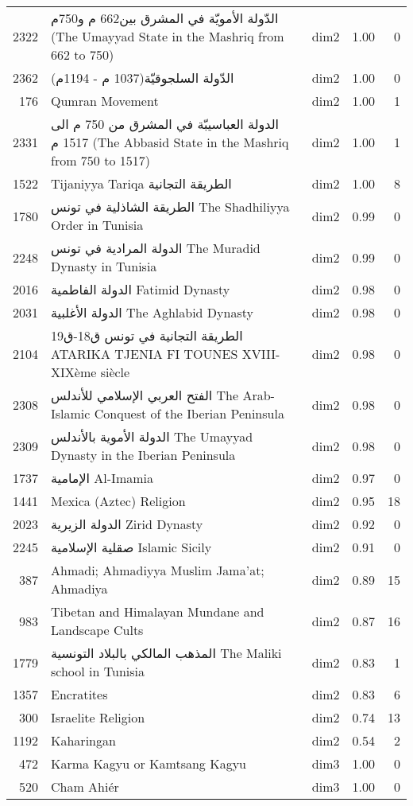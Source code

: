 \begin{tabular}{rllrr}
2322 & الدّولة الأمويّة في المشرق  بين662 م و750م (The Umayyad State in the Mashriq from 662 to 750) & dim2 & 1.00 & 0 \\
2362 & الدّولة السلجوقيّة(1037 م - 1194م) & dim2 & 1.00 & 0 \\
176 & Qumran Movement & dim2 & 1.00 & 1 \\
2331 & الدولة العباسيبّة في المشرق  من 750 م الى 1517 م (The Abbasid State in the Mashriq from 750 to 1517) & dim2 & 1.00 & 1 \\
1522 & Tijaniyya Tariqa الطريقة التجانية & dim2 & 1.00 & 8 \\
1780 & الطريقة الشاذلية في تونس The Shadhiliyya Order in Tunisia & dim2 & 0.99 & 0 \\
2248 & الدولة المرادية في تونس The Muradid Dynasty in Tunisia & dim2 & 0.99 & 0 \\
2016 & الدولة الفاطمية Fatimid Dynasty & dim2 & 0.98 & 0 \\
2031 & الدولة الأغلبية The Aghlabid Dynasty & dim2 & 0.98 & 0 \\
2104 & الطريقة التجانية في تونس ق18-ق19 ATARIKA TJENIA FI TOUNES  XVIII-XIXème siècle & dim2 & 0.98 & 0 \\
2308 & الفتح العربي الإسلامي للأندلس The Arab-Islamic Conquest of the Iberian Peninsula & dim2 & 0.98 & 0 \\
2309 & الدولة الأموية بالأندلس The Umayyad Dynasty in the Iberian Peninsula & dim2 & 0.98 & 0 \\
1737 & الإمامية Al-Imamia & dim2 & 0.97 & 0 \\
1441 & Mexica (Aztec) Religion & dim2 & 0.95 & 18 \\
2023 & الدولة الزيرية Zirid Dynasty & dim2 & 0.92 & 0 \\
2245 & صقلية الإسلامية Islamic Sicily & dim2 & 0.91 & 0 \\
387 & Ahmadi; Ahmadiyya Muslim Jama'at; Ahmadiya & dim2 & 0.89 & 15 \\
983 & Tibetan and Himalayan Mundane and Landscape Cults & dim2 & 0.87 & 16 \\
1779 & المذهب المالكي بالبلاد التونسية The Maliki school in Tunisia & dim2 & 0.83 & 1 \\
1357 & Encratites & dim2 & 0.83 & 6 \\
300 & Israelite Religion & dim2 & 0.74 & 13 \\
1192 & Kaharingan & dim2 & 0.54 & 2 \\
472 & Karma Kagyu or Kamtsang Kagyu & dim3 & 1.00 & 0 \\
520 & Cham Ahiér & dim3 & 1.00 & 0 \\

\end{tabular}

